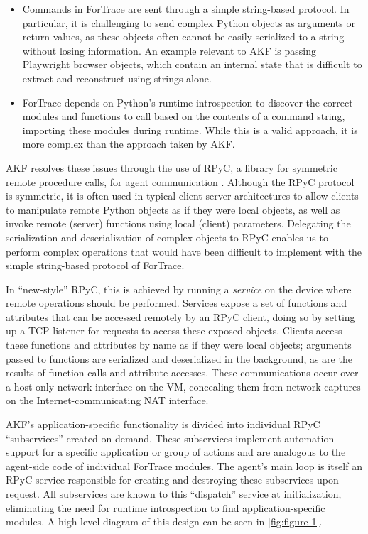 \documentclass[preprint,12pt]{elsarticle}
\begin{document}
\begin{itemize}
\item
  Commands in ForTrace are sent through a simple string-based protocol.
  In particular, it is challenging to send complex Python objects as
  arguments or return values, as these objects often cannot be easily
  serialized to a string without losing information. An example relevant
  to AKF is passing Playwright browser objects, which contain an
  internal state that is difficult to extract and reconstruct using
  strings alone.
\item
  ForTrace depends on Python's runtime introspection to discover the
  correct modules and functions to call based on the contents of a
  command string, importing these modules during runtime. While this is
  a valid approach, it is more complex than the approach taken by AKF.
\end{itemize}

AKF resolves these issues through the use of RPyC, a library for
symmetric remote procedure calls, for agent communication
\citep{TomerfilibaorgRpyc2025}. Although the RPyC protocol is
symmetric, it is often used in typical client-server architectures to
allow clients to manipulate remote Python objects as if they were local
objects, as well as invoke remote (server) functions using local
(client) parameters. Delegating the serialization and deserialization of
complex objects to RPyC enables us to perform complex operations that
would have been difficult to implement with the simple string-based
protocol of ForTrace.

In ``new-style'' RPyC, this is achieved by running a \emph{service} on
the device where remote operations should be performed. Services expose
a set of functions and attributes that can be accessed remotely by an
RPyC client, doing so by setting up a TCP listener for requests to
access these exposed objects. Clients access these functions and
attributes by name as if they were local objects; arguments passed to
functions are serialized and deserialized in the background, as are the
results of function calls and attribute accesses. These communications
occur over a host-only network interface on the VM, concealing them from
network captures on the Internet-communicating NAT interface.

AKF's application-specific functionality is divided into individual RPyC
``subservices'' created on demand. These subservices implement
automation support for a specific application or group of actions and
are analogous to the agent-side code of individual ForTrace modules. The
agent's main loop is itself an RPyC service responsible for creating and
destroying these subservices upon request. All subservices are known to
this ``dispatch'' service at initialization, eliminating the need for
runtime introspection to find application-specific modules. A high-level
diagram of this design can be seen in \autoref{fig:figure-1}.
\end{document}
